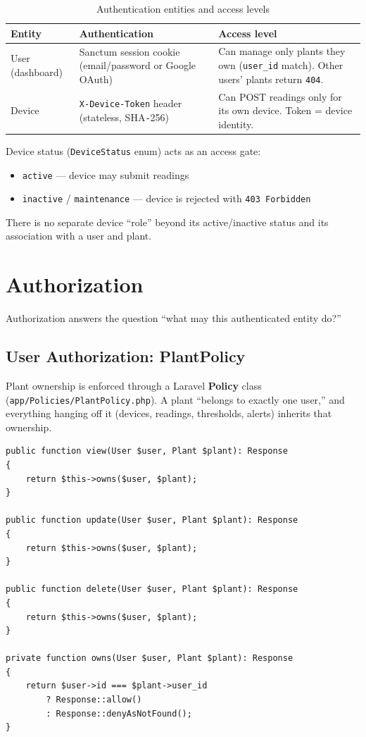 \documentclass[11pt,a4paper]{article}
\begin{document}
\begin{table}[h]
\centering
\small
\begin{tabular}{p{3cm}p{4cm}p{5cm}}
\toprule
\textbf{Entity} & \textbf{Authentication} & \textbf{Access level} \\
\midrule
User (dashboard) & Sanctum session cookie (email/password or Google OAuth) & Can manage only plants they own (\texttt{user\_id} match). Other users' plants return \texttt{404}. \\
Device & \texttt{X-Device-Token} header (stateless, SHA\texttt{-}256) & Can POST readings only for its own device. Token = device identity. \\
\midrule
\end{tabular}
\caption{Authentication entities and access levels}
\end{table}

Device status (\texttt{DeviceStatus} enum) acts as an access gate:
\begin{itemize}
    \item \texttt{active} --- device may submit readings
    \item \texttt{inactive} / \texttt{maintenance} --- device is rejected with \texttt{403 Forbidden}
\end{itemize}

There is no separate device ``role'' beyond its active/inactive status and its association with a user and plant.

\section{Authorization}\label{sec:authorization}

Authorization answers the question ``what may this authenticated entity do?''

\subsection{User Authorization: PlantPolicy}

Plant ownership is enforced through a Laravel \textbf{Policy} class (\texttt{app/Policies/PlantPolicy.php}). A plant ``belongs to exactly one user,'' and everything hanging off it (devices, readings, thresholds, alerts) inherits that ownership.

\begin{lstlisting}[caption=PlantPolicy authorization rules]
public function view(User $user, Plant $plant): Response
{
    return $this->owns($user, $plant);
}

public function update(User $user, Plant $plant): Response
{
    return $this->owns($user, $plant);
}

public function delete(User $user, Plant $plant): Response
{
    return $this->owns($user, $plant);
}

private function owns(User $user, Plant $plant): Response
{
    return $user->id === $plant->user_id
        ? Response::allow()
        : Response::denyAsNotFound();
}
\end{lstlisting}
\end{document}
